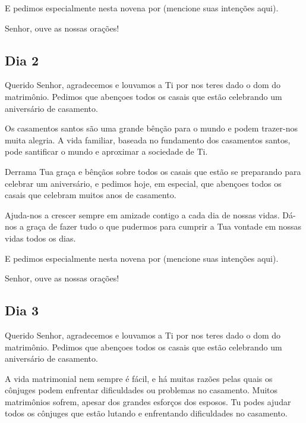 \documentclass[18pt]{article}
\begin{document}
E pedimos especialmente nesta novena por (mencione suas intenções aqui).  

Senhor, ouve as nossas orações!  

\begin{center}
 \textbf{}
\end{center}

\begin{center}
 \subsection*{Dia 2}
\end{center}

Querido Senhor, agradecemos e louvamos a Ti por nos teres dado o dom do matrimônio. Pedimos que abençoes todos os casais que estão celebrando um aniversário de casamento.  

Os casamentos santos são uma grande bênção para o mundo e podem trazer-nos muita alegria. A vida familiar, baseada no fundamento dos casamentos santos, pode santificar o mundo e aproximar a sociedade de Ti.  

Derrama Tua graça e bênçãos sobre todos os casais que estão se preparando para celebrar um aniversário, e pedimos hoje, em especial, que abençoes todos os casais que celebram muitos anos de casamento.  

Ajuda-nos a crescer sempre em amizade contigo a cada dia de nossas vidas. Dá-nos a graça de fazer tudo o que pudermos para cumprir a Tua vontade em nossas vidas todos os dias.  

E pedimos especialmente nesta novena por (mencione suas intenções aqui).  

Senhor, ouve as nossas orações!  
\begin{center}
 \textbf{}
\end{center}



\begin{center}
 \subsection*{Dia 3}
\end{center}

Querido Senhor, agradecemos e louvamos a Ti por nos teres dado o dom do matrimônio. Pedimos que abençoes todos os casais que estão celebrando um aniversário de casamento.  

A vida matrimonial nem sempre é fácil, e há muitas razões pelas quais os cônjuges podem enfrentar dificuldades ou problemas no casamento. Muitos matrimônios sofrem, apesar dos grandes esforços dos esposos. Tu podes ajudar todos os cônjuges que estão lutando e enfrentando dificuldades no casamento.  
\end{document}

